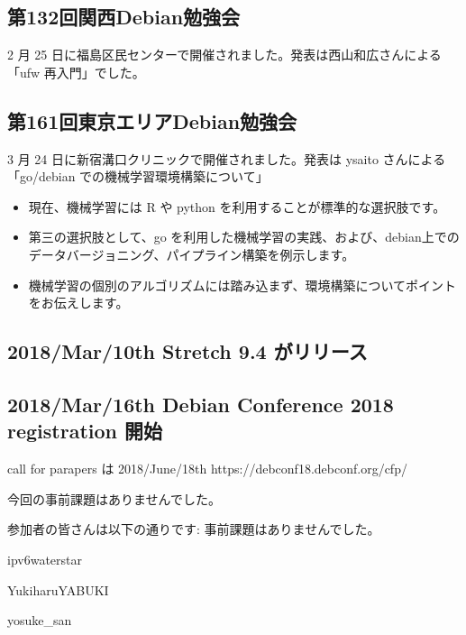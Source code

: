 \documentclass[mingoth,a4paper]{jsarticle}
\begin{document}
\subsection{第132回関西Debian勉強会}
2 月 25 日に福島区民センターで開催されました。発表は西山和広さんによる「ufw 再入門」でした。 

\subsection{第161回東京エリアDebian勉強会}
3 月 24 日に新宿溝口クリニックで開催されました。発表は ysaito さんによる 「go/debian での機械学習環境構築について」

\begin{itemize}
		\item 現在、機械学習には R や python を利用することが標準的な選択肢です。
		\item 第三の選択肢として、go を利用した機械学習の実践、および、debian上でのデータバージョニング、パイプライン構築を例示します。
		\item 機械学習の個別のアルゴリズムには踏み込まず、環境構築についてポイントをお伝えします。
\end{itemize}


\subsection{2018/Mar/10th Stretch 9.4 がリリース}
\subsection{2018/Mar/16th Debian Conference 2018 registration 開始}
			call for parapers は 2018/June/18th https://debconf18.debconf.org/cfp/


今回の事前課題はありませんでした。

参加者の皆さんは以下の通りです:
事前課題はありませんでした。

\begin{prework}{ ipv6waterstar }
\end{prework}

\begin{prework}{YukiharuYABUKI}
\end{prework}

\begin{prework}{ yosuke\_san }
\end{prework}
\end{document}
